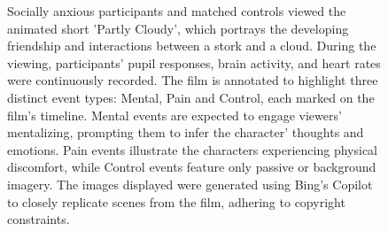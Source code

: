 \begin{figure}[!ht]
	\centering
	\caption{Socially anxious participants and matched controls viewed the animated short 'Partly Cloudy', which portrays the developing friendship and interactions between a stork and a cloud. During the viewing, participants' pupil responses, brain activity, and heart rates were continuously recorded. The film is annotated to highlight three distinct event types: Mental, Pain and Control, each marked on the film's timeline. Mental events are expected to engage viewers' mentalizing, prompting them to infer the character' thoughts and emotions. Pain events illustrate the characters experiencing physical discomfort, while Control events feature only passive or background imagery. The images displayed were generated using Bing's Copilot to closely replicate scenes from the film, adhering to copyright constraints.}
    \vspace*{-10pt}
	\label{fig:task-fig-sa}
\end{figure}

